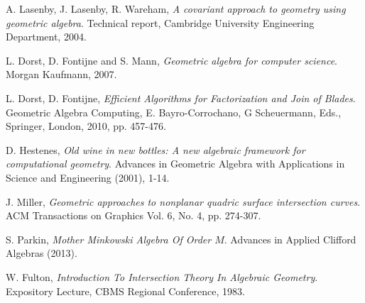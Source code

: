 \documentclass{birkjour}
\theoremstyle{definition}
\theoremstyle{remark}
\numberwithin{equation}{section}
\begin{document}
\begin{thebibliography}{9}

A. Lasenby, J. Lasenby, R. Wareham, {\it A covariant approach
to geometry using geometric algebra}.  Technical report, Cambridge University
Engineering Department, 2004.

L. Dorst, D. Fontijne and S. Mann, {\it Geometric algebra for computer
science}. Morgan Kaufmann, 2007.

L. Dorst, D. Fontijne, {\it Efficient Algorithms for Factorization and Join
of Blades}.  Geometric Algebra Computing, E. Bayro-Corrochano, G Scheuermann, Eds.,
Springer, London, 2010, pp. 457-476.

D. Hestenes, {\it Old wine in new bottles: A new algebraic
framework for computational geometry}. Advances in Geometric
Algebra with Applications in Science and Engineering (2001), 1-14.

J. Miller, {\it Geometric approaches to nonplanar quadric surface
intersection curves}. ACM Transactions on Graphics Vol. 6, No. 4, pp.
274-307.

S. Parkin, {\it Mother Minkowski Algebra Of Order $M$}.
Advances in Applied Clifford Algebras (2013).

W. Fulton, {\it Introduction To Intersection Theory In Algebraic Geometry}.
Expository Lecture, CBMS Regional Conference, 1983.

\end{thebibliography}
\end{document}
